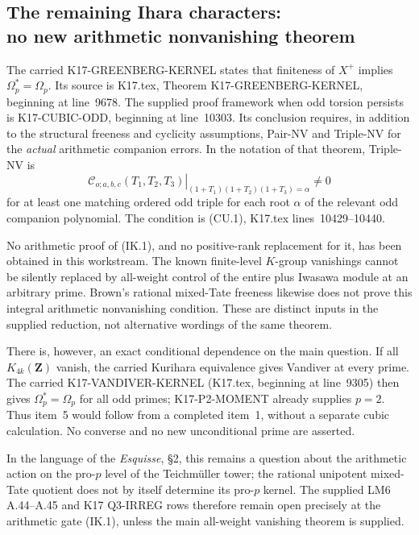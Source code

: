 \documentclass[11pt,a4paper]{article}
\theoremstyle{definition}
\begin{document}


\subsection[The remaining Ihara characters: no new arithmetic nonvanishing theorem]{The remaining Ihara characters:\\no new arithmetic nonvanishing theorem}
\label{sec:kt-ihara-gate}

The carried K17-GREENBERG-KERNEL states that finiteness of
$X^+$ implies $\Omega_p^*=\Omega_p$. Its source is
K17.tex, Theorem K17-GREENBERG-KERNEL, beginning at
line~9678. The supplied proof framework when odd torsion
persists is K17-CUBIC-ODD, beginning at line~10303.
Its conclusion requires, in addition to the structural
freeness and cyclicity assumptions, Pair-NV and Triple-NV
for the \emph{actual} arithmetic companion errors.
In the notation of that theorem, Triple-NV is
\[
 \left.
 \mathcal C_{o;a,b,c}(T_1,T_2,T_3)
 \right|_{(1+T_1)(1+T_2)(1+T_3)=\alpha}\ne0
                                                               \tag{IK.1}
\]
for at least one matching ordered odd triple for each root
$\alpha$ of the relevant odd companion polynomial.
The condition is (CU.1), K17.tex lines~10429--10440.

No arithmetic proof of (IK.1), and no positive-rank
replacement for it, has been obtained in this workstream.
The known finite-level $K$-group vanishings cannot be
silently replaced by all-weight control of the entire
plus Iwasawa module at an arbitrary prime. Brown's rational
mixed-Tate freeness likewise does not prove this integral
arithmetic nonvanishing condition. These are distinct
inputs in the supplied reduction, not alternative wordings
of the same theorem.

There is, however, an exact conditional dependence on the
main question. If all $K_{4k}(\mathbf Z)$ vanish, the carried
Kurihara equivalence gives Vandiver at every prime. The
carried K17-VANDIVER-KERNEL (K17.tex, beginning at line~9305)
then gives $\Omega_p^*=\Omega_p$ for all odd primes; K17-P2-MOMENT
already supplies $p=2$. Thus item~5 would follow from a
completed item~1, without a separate cubic calculation.
No converse and no new unconditional prime are asserted.

In the language of the \emph{Esquisse}, \S2, this remains
a question about the arithmetic action on the pro-$p$
level of the Teichm\"uller tower; the rational unipotent
mixed-Tate quotient does not by itself determine its
pro-$p$ kernel. The supplied LM6 A.44--A.45 and K17
Q3-IRREG rows therefore remain open precisely at the
arithmetic gate (IK.1), unless the main all-weight
vanishing theorem is supplied.


\end{document}
